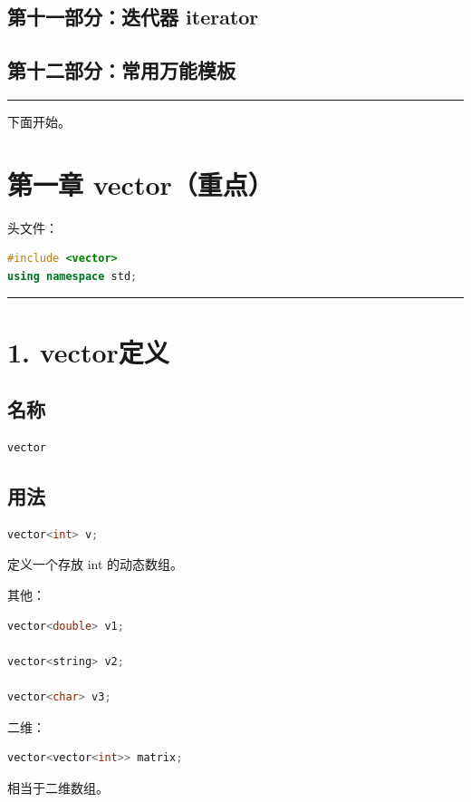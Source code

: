 \documentclass[10pt,twocolumn]{extarticle}
\begin{document}
\subsection*{第十一部分：迭代器 iterator}
\subsection*{第十二部分：常用万能模板}

\noindent\rule{\linewidth}{0.4pt}

下面开始。

\section{第一章 vector（重点）}

头文件：

\begin{lstlisting}[language=C++]
#include <vector>
using namespace std;
\end{lstlisting}

\noindent\rule{\linewidth}{0.4pt}

\section{1. vector定义}

\subsection{名称}
\begin{lstlisting}[language=C++]
vector
\end{lstlisting}

\subsection{用法}
\begin{lstlisting}[language=C++]
vector<int> v;
\end{lstlisting}
定义一个存放 int 的动态数组。

其他：
\begin{lstlisting}[language=C++]
vector<double> v1;

vector<string> v2;

vector<char> v3;
\end{lstlisting}

二维：
\begin{lstlisting}[language=C++]
vector<vector<int>> matrix;
\end{lstlisting}
相当于二维数组。
\end{document}
